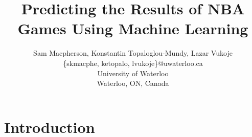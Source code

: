 \documentclass[letterpaper]{article} %
\begin{document}
%
\title{Predicting the Results of NBA Games Using Machine Learning}
\author{Sam Macpherson, Konstantin Topaloglou-Mundy, Lazar Vukoje\\
\{skmacphe, ketopalo, lvukoje\}@uwaterloo.ca\\
University of Waterloo\\
Waterloo, ON, Canada\\
}
\maketitle



\section{Introduction}
\end{document}
